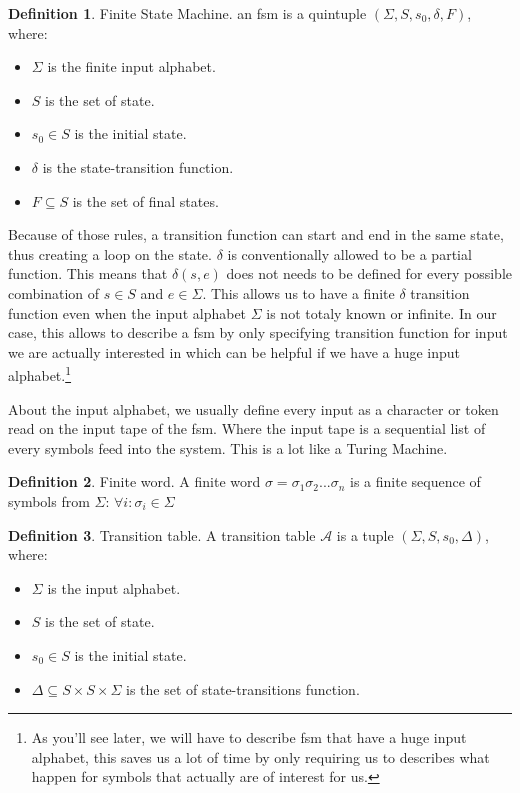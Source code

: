 \documentclass[12pt]{article}
\theoremstyle{definition}
\newtheorem{definition}{Definition}[section]
\theoremstyle{definition}
\theoremstyle{remark}
\newcommand{\A}{\mathcal{A}}
\begin{document}
\theoremstyle{definition}
\begin{definition}{Finite State Machine.} an \gls{fsm} is a quintuple $(\Sigma, S, s_{0},\delta, F)$, where:
\begin{itemize}
\item $\Sigma$ is the finite input alphabet.
\item $S$ is the set of state.
\item $s_{0} \in S$ is the initial state.
\item $\delta$ is the state-transition function.
\item $F \subseteq S$ is the set of final states.
\end{itemize}
\end{definition}

Because of those rules, a transition function can start and end in the same state, thus creating a loop on the state. $\delta$ is conventionally allowed to be a partial function. This means that $\delta(s, e)$ does not needs to be defined for every possible combination of $s \in S$ and $e \in \Sigma$. This allows us to have a finite $\delta$ transition function even when the input alphabet $\Sigma$ is not totaly known or infinite. In our case, this allows to describe a \gls{fsm} by only specifying transition function for input we are actually interested in which can be helpful if we have a huge input alphabet.\footnote{As you'll see later, we will have to describe \gls{fsm} that have a huge input alphabet, this saves us a lot of time by only requiring us to describes what happen for symbols that actually are of interest for us.}

About the input alphabet, we usually define every input as a character or token read on the input tape of the \gls{fsm}. Where the input tape is a sequential list of every symbols feed into the system. This is a lot like a Turing Machine.

\theoremstyle{definition}
\begin{definition}{Finite word.} A finite word $\sigma = \sigma_1 \sigma_2 ... \sigma_n$ is a finite sequence of symbols from $\Sigma$: $\forall i: \sigma_i \in \Sigma$
\end{definition}

\theoremstyle{definition}
\begin{definition}{Transition table.} A transition table $\A$ is a tuple $(\Sigma, S, s_{0}, \Delta)$, where:
\begin{itemize}
\item $\Sigma$ is the input alphabet.
\item $S$ is the set of state.
\item $s_{0} \in S$ is the initial state.
\item $\Delta \subseteq S \times S \times \Sigma$ is the set of state-transitions function.
\end{itemize}
\end{definition}
\end{document}
